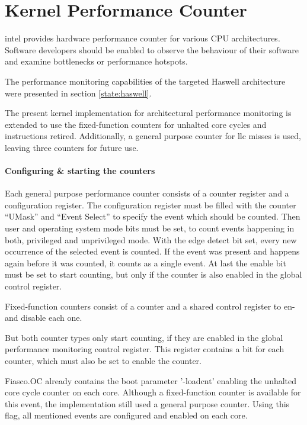 \section{Kernel Performance Counter}
\label{impl:perfcounter}

\gls{intel} provides hardware performance counter for various CPU
architectures.
Software developers should be enabled to observe the behaviour of their
software and examine bottlenecks or performance hotspots.

The performance monitoring capabilities of the targeted Haswell architecture
were presented in section \ref{state:haswell}.

The present kernel implementation for architectural performance monitoring is
extended to use the fixed-function counters for unhalted core cycles and
instructions retired.
Additionally, a general purpose counter for \gls{llc} misses is used,
leaving three counters for future use.

\paragraph{Configuring \& starting the counters}
Each general purpose performance counter consists of a counter register and a
configuration register.
The configuration register must be filled with the counter ``UMask'' and
``Event Select'' to specify the event which should be counted.
Then user and operating system mode bits must be set, to count events happening
in both, privileged and unprivileged mode.
With the edge detect bit set, every new occurrence of the selected event is
counted.
If the event was present and happens again before it was counted, it counts as
a single event.
At last the enable bit must be set to start counting, but only if the counter
is also enabled in the global control register.

Fixed-function counters consist of a counter and a shared control register to
en- and disable each one.

But both counter types only start counting, if they are enabled in the global
performance monitoring control register.
This register contains a bit for each counter, which must also be set to enable
the counter.

Fiasco.OC already contains the boot parameter '-loadcnt' enabling the unhalted
core cycle counter on each core.
Although a fixed-function counter is available for this event, the
implementation still used a general purpose counter.
Using this flag, all mentioned events are configured and enabled on each core.

